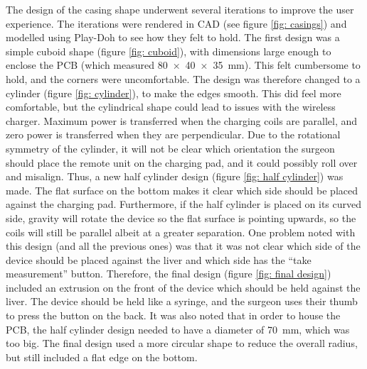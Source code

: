 The design of the casing shape underwent several iterations to improve the user experience. The iterations were rendered in CAD (see figure \ref{fig: casings}) and modelled using Play-Doh to see how they felt to hold. The first design was a simple cuboid shape (figure \ref{fig: cuboid}), with dimensions large enough to enclose the PCB (which measured \SI{80x40x35}{\milli\metre}). This felt cumbersome to hold, and the corners were uncomfortable. The design was therefore changed to a cylinder (figure \ref{fig: cylinder}), to make the edges smooth. This did feel more comfortable, but the cylindrical shape could lead to issues with the wireless charger. Maximum power is transferred when the charging coils are parallel, and zero power is transferred when they are perpendicular. Due to the rotational symmetry of the cylinder, it will not be clear which orientation the surgeon should place the remote unit on the charging pad, and it could possibly roll over and misalign. Thus, a new half cylinder design (figure \ref{fig: half cylinder}) was made. The flat surface on the bottom makes it clear which side should be placed against the charging pad. Furthermore, if the half cylinder is placed on its curved side, gravity will rotate the device so the flat surface is pointing upwards, so the coils will still be parallel albeit at a greater separation. One problem noted with this design (and all the previous ones) was that it was not clear which side of the device should be placed against the liver and which side has the ``take measurement'' button. Therefore, the final design (figure \ref{fig: final design}) included an extrusion on the front of the device which should be held against the liver. The device should be held like a syringe, and the surgeon uses their thumb to press the button on the back. It was also noted that in order to house the PCB, the half cylinder design needed to have a diameter of \SI{70}{\milli\metre}, which was too big. The final design used a more circular shape to reduce the overall radius, but still included a flat edge on the bottom.\\

